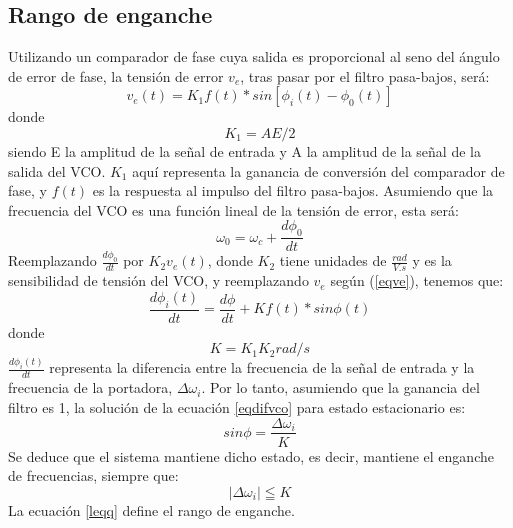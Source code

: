 \documentclass{article}
\begin{document}
\subsection{Rango de enganche}
Utilizando un comparador de fase cuya salida es proporcional al seno del ángulo de error de fase, la tensión de error $v_{e}$, tras pasar por el filtro pasa-bajos, será:
\begin{equation}\label{eqve}
    v_{e}(t)=K_{1}f(t)\ast sin[\phi_{i}(t)-\phi_{0}(t)]
\end{equation}
donde
\begin{equation*}
    K_{1}=AE/2
\end{equation*}
siendo E la amplitud de la señal de entrada y A la amplitud de la señal de la salida del VCO. $K_{1}$ aquí representa la ganancia de conversión del comparador de fase, y $f(t)$ es la respuesta al impulso del filtro pasa-bajos.
Asumiendo que la frecuencia del VCO es una función lineal de la tensión de error, esta será:
\begin{equation}
    \omega_{0}=\omega_{c}+\frac{d\phi_{0}}{dt}
\end{equation}
Reemplazando $\frac{d\phi_{0}}{dt}$ por $K_{2}v_{e}(t)$, donde $K_{2}$ tiene unidades de $\frac{rad}{V.s}$ y es la sensibilidad de tensión del VCO, y reemplazando $v_{e}$ según (\ref{eqve}), tenemos que:
\begin{equation}\label{eqdifvco}
    \frac{d\phi_{i}(t)}{dt}=\frac{d\phi}{dt}+Kf(t)\ast sin \phi(t)
\end{equation}
donde
\begin{equation*}
    K=K_{1}K_{2} rad/s
\end{equation*}
$\frac{d\phi_{i}(t)}{dt}$ representa la diferencia entre la frecuencia de la señal de entrada y la frecuencia de la portadora, $\Delta\omega_{i}$. Por lo tanto, asumiendo que la ganancia del filtro es 1, la solución de la ecuación \ref{eqdifvco} para estado estacionario es:
\begin{equation}\label{eqseno}
    sin\phi=\frac{\Delta\omega_{i}}{K}
\end{equation}
Se deduce que el sistema mantiene dicho estado, es decir, mantiene el enganche de frecuencias, siempre que:
\begin{equation}\label{leqq}
    |\Delta\omega_{i}| \leqq K
\end{equation}
La ecuación \ref{leqq} define el rango de enganche.
\end{document}
